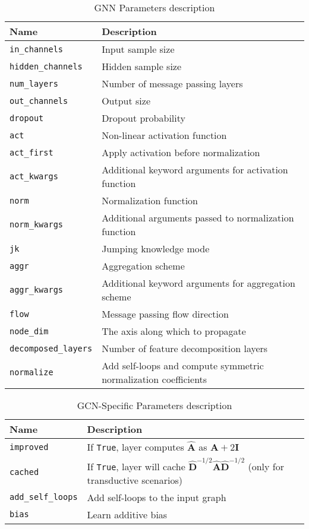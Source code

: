 \begin{table}[H]
	\centering
	\caption{\ac{GNN} Parameters description}
	\begin{tabularx}{\textwidth}{lX}
		\toprule
		\textbf{Name} & \textbf{Description} \\
		\midrule
		\texttt{in\_channels} & Input sample size \\
		\texttt{hidden\_channels} & Hidden sample size\\
		\texttt{num\_layers} & Number of message passing layers  \\
		\texttt{out\_channels} & Output size \\
		\texttt{dropout} & Dropout probability \\
		\texttt{act} & Non-linear activation function \\
		\texttt{act\_first} & Apply activation before normalization \\
		\texttt{act\_kwargs} & Additional keyword arguments for activation function \\
		\texttt{norm} & Normalization function \\
		\texttt{norm\_kwargs} & Additional arguments passed to normalization function \\
		\texttt{jk} & Jumping knowledge mode \\
		\texttt{aggr} & Aggregation scheme \\
		\texttt{aggr\_kwargs} & Additional keyword arguments for aggregation scheme \\
		\texttt{flow} & Message passing flow direction \\
		\texttt{node\_dim} & The axis along which to propagate \\
		\texttt{decomposed\_layers} & Number of feature decomposition layers\\
		\texttt{normalize} & Add self-loops and compute symmetric normalization coefficients \\
		\bottomrule
	\end{tabularx}
	\label{tab:gnn-params}
\end{table}

\begin{table}[H]
	\centering
	\caption{\ac{GCN}-Specific Parameters description}
	\begin{tabularx}{\textwidth}{lX}
		\toprule
		\textbf{Name} & \textbf{Description} \\
		\midrule
		\texttt{improved} & If \texttt{True}, layer computes $\mathbf{\hat{A}}$ as $\mathbf{A} + 2\mathbf{I}$ \\
		\texttt{cached} & If \texttt{True}, layer will cache $\mathbf{\hat{D}}^{-1/2} \mathbf{\hat{A}} \mathbf{\hat{D}}^{-1/2}$ (only for transductive scenarios) \\
		\texttt{add\_self\_loops} & Add self-loops to the input graph \\
		\texttt{bias} & Learn additive bias \\
		\bottomrule
	\end{tabularx}
	\label{tab:gcn-params}
\end{table}

